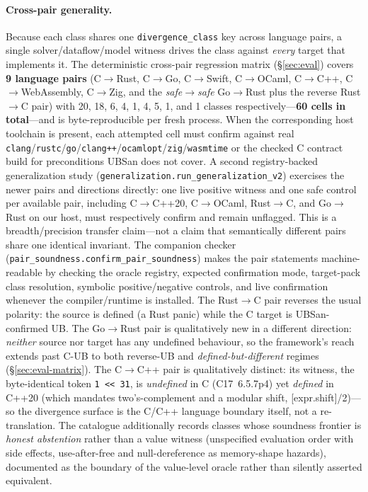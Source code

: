 \documentclass[10pt,a4paper]{article}
\begin{document}
\paragraph{Cross-pair generality.} Because each class shares one
\texttt{divergence\_class} key across language pairs, a single solver/dataflow/model witness drives
the class against \emph{every} target that implements it. The deterministic
cross-pair regression matrix (\S\ref{sec:eval}) covers \textbf{9 language pairs}
(C$\to$Rust, C$\to$Go, C$\to$Swift, C$\to$OCaml, C$\to$C++, C$\to$WebAssembly,
C$\to$Zig, and the \emph{safe$\to$safe} Go$\to$Rust plus the reverse Rust$\to$C
pair) with 20, 18, 6, 4, 1, 4, 5, 1, and 1 classes
respectively---\textbf{60 cells in total}---and is
byte-reproducible per fresh
process. When the corresponding host toolchain is present, each attempted cell
must confirm against real
\texttt{clang}/\texttt{rustc}/\texttt{go}/\texttt{clang++}/\texttt{ocamlopt}/\texttt{zig}/\texttt{wasmtime}
or the checked C contract build for preconditions UBSan does not cover.
A second registry-backed generalization study
(\texttt{generalization.run\_generalization\_v2}) exercises the newer pairs and
directions directly: one live positive witness and one safe control per available
pair, including C$\to$C++20, C$\to$OCaml, Rust$\to$C, and Go$\to$Rust on our
host, must respectively confirm and remain unflagged. This is a breadth/precision
transfer claim---not a claim that semantically different pairs share one
identical invariant. The companion checker
(\texttt{pair\_soundness.confirm\_pair\_soundness}) makes the pair statements
machine-readable by checking the oracle registry, expected confirmation mode,
target-pack class resolution, symbolic positive/negative controls, and live
confirmation whenever the compiler/runtime is installed.
The Rust$\to$C pair reverses the usual polarity: the source is defined (a Rust
panic) while the C target is UBSan-confirmed UB. The Go$\to$Rust pair is
qualitatively new in a different direction: \emph{neither} source nor target has
any undefined behaviour, so the framework's reach extends past C-UB to both
reverse-UB and \emph{defined-but-different} regimes (\S\ref{sec:eval-matrix}).
The C$\to$C++
pair is qualitatively distinct: its witness, the byte-identical token
\texttt{1 << 31}, is \emph{undefined} in C (C17~6.5.7p4) yet \emph{defined} in
C++20 (which mandates two's-complement and a modular shift,
[expr.shift]/2)---so the divergence surface is the C/C++ language boundary
itself, not a re-translation. The catalogue additionally records
classes whose soundness frontier is \emph{honest abstention} rather than a value
witness (unspecified evaluation order with side effects, use-after-free and
null-dereference as memory-shape hazards), documented as the boundary of the
value-level oracle rather than silently asserted equivalent.
\end{document}
